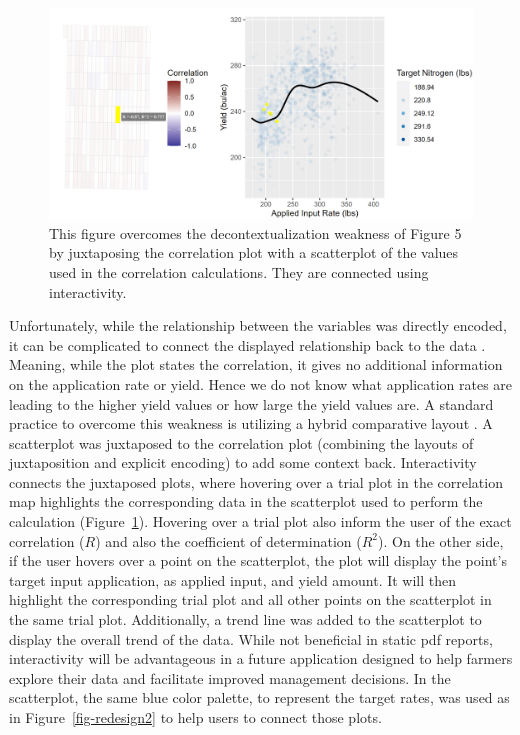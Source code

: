 \documentclass[
  authoryear,
  preprint,
  3p]{elsarticle}
\begin{document}
\begin{figure}

{\centering \includegraphics{../images/paper/corr-with-scat3.png}

}

\caption{\label{fig-redesign4}This figure overcomes the
decontextualization weakness of Figure 5 by juxtaposing the correlation
plot with a scatterplot of the values used in the correlation
calculations. They are connected using interactivity.}

\end{figure}

Unfortunately, while the relationship between the variables was directly
encoded, it can be complicated to connect the displayed relationship
back to the data \citep{gleicher2011}. Meaning, while the plot states
the correlation, it gives no additional information on the application
rate or yield. Hence we do not know what application rates are leading
to the higher yield values or how large the yield values are. A standard
practice to overcome this weakness is utilizing a hybrid comparative
layout \citep{lyi2021}. A scatterplot was juxtaposed to the correlation
plot (combining the layouts of juxtaposition and explicit encoding) to
add some context back. Interactivity connects the juxtaposed plots,
where hovering over a trial plot in the correlation map highlights the
corresponding data in the scatterplot used to perform the calculation
(Figure~\ref{fig-redesign4}). Hovering over a trial plot also inform the
user of the exact correlation (\(R\)) and also the coefficient of
determination (\(R^2\)). On the other side, if the user hovers over a
point on the scatterplot, the plot will display the point's target input
application, as applied input, and yield amount. It will then highlight
the corresponding trial plot and all other points on the scatterplot in
the same trial plot. Additionally, a trend line was added to the
scatterplot to display the overall trend of the data. While not
beneficial in static pdf reports, interactivity will be advantageous in
a future application designed to help farmers explore their data and
facilitate improved management decisions. In the scatterplot, the same
blue color palette, to represent the target rates, was used as in
Figure~\ref{fig-redesign2} to help users to connect those plots.
\end{document}
